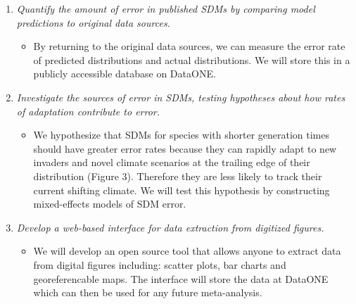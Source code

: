 \documentclass[pdftex,11pt,a4paper]{article}\usepackage{graphicx, color}
\begin{document}
\begin{enumerate}
    \item \textit{Quantify the amount of error in published SDMs by comparing model predictions to original data sources.}
        
        \begin{itemize}
        \item By returning to the original data sources, we can measure the error rate of predicted distributions and actual distributions.  We will store this in a publicly accessible database on DataONE.
        \end{itemize}
   \item \textit{Investigate the sources of error in SDMs, testing hypotheses about how rates of adaptation contribute to error. }
        \begin{itemize}
        \item We hypothesize that SDMs for species with shorter generation times should have greater error rates because they can rapidly adapt to new invaders and novel climate scenarios at the trailing edge of their distribution (Figure 3).  Therefore they are less likely to track their current shifting climate.  We will test this hypothesis by constructing mixed-effects models of SDM error.
        \end{itemize}
     
    
    \item \textit{Develop a web-based interface for data extraction from digitized figures.}
      \begin{itemize}
        \item We will develop an open source tool that allows anyone to extract data from digital figures including: scatter plots, bar charts and georeferencable maps.  The interface will store the data at DataONE which can then be used for any future meta-analysis.
        \end{itemize} 
\end{enumerate}
\end{document}
